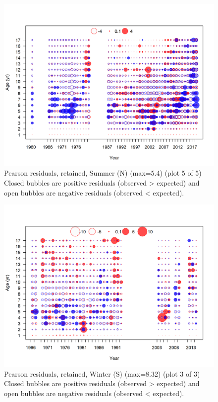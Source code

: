 \documentclass[12pt,]{article}
\begin{document}
\begin{figure}
\centering
\includegraphics{r4ss/plots_mod1/comp_agefit_residsflt2mkt2_page5.png}
\caption{Pearson residuals, retained, Summer (N) (max=5.4) (plot 5 of
5)\\
Closed bubbles are positive residuals (observed \textgreater{} expected)
and open bubbles are negative residuals (observed \textless{} expected).
\label{fig:sn_age_pearson}}
\end{figure}

\begin{figure}
\centering
\includegraphics{r4ss/plots_mod1/comp_agefit_residsflt3mkt2_page3.png}
\caption{Pearson residuals, retained, Winter (S) (max=8.32) (plot 3 of
3)\\
Closed bubbles are positive residuals (observed \textgreater{} expected)
and open bubbles are negative residuals (observed \textless{} expected).
\label{fig:ws_age_pearson}}
\end{figure}
\end{document}

